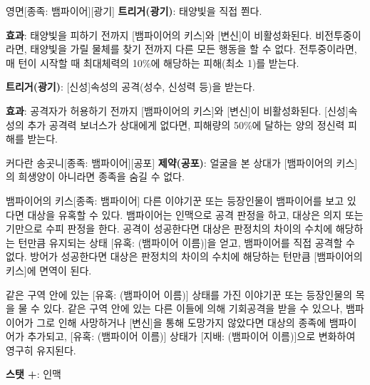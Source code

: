 \documentclass{report}
\begin{document}
	\begin{story}{영면}{[종족: 뱀파이어][광기]}
		\textbf{트리거(광기)}: 태양빛을 직접 쬔다.
		
		\textbf{효과}: 태양빛을 피하기 전까지 [뱀파이어의 키스]와 [변신]이 비활성화된다. 비전투중이라면, 태양빛을 가릴 물체를 찾기 전까지 다른 모든 행동을 할 수 없다. 전투중이라면, 매 턴이 시작할 때 최대체력의 10\%에 해당하는 피해(최소 1)를 받는다.
		
		\smallskip
		
		\textbf{트리거(광기)}: [신성]속성의 공격(성수, 신성력 등)을 받는다.
		
		\textbf{효과}: 공격자가 허용하기 전까지 [뱀파이어의 키스]와 [변신]이 비활성화된다. [신성]속성의 추가 공격력 보너스가 상대에게 없다면, 피해량의 50\%에 달하는 양의 정신력 피해를 받는다.
		
		\smallskip
		
	\end{story}
	
	\begin{story}{커다란 송곳니}{[종족: 뱀파이어][공포]}
		\textbf{제약(공포)}: 얼굴을 본 상대가 [뱀파이어의 키스]의 희생양이 아니라면 종족을 숨길 수 없다.
		
		\smallskip
		
	\end{story}
	
	\begin{story}{뱀파이어의 키스}{[종족: 뱀파이어]}
		다른 이야기꾼 또는 등장인물이 뱀파이어를 보고 있다면 대상을 유혹할 수 있다. 뱀파이어는 인맥으로 공격 판정을 하고, 대상은 의지 또는 기만으로 수피 판정을 한다. 공격이 성공한다면 대상은 판정치의 차이의 수치에 해당하는 턴만큼 유지되는 상태 [유혹: (뱀파이어 이름)]을 얻고, 뱀파이어를 직접 공격할 수 없다. 방어가 성공한다면 대상은 판정치의 차이의 수치에 해당하는 턴만큼 [뱀파이어의 키스]에 면역이 된다.
		
		\smallskip
		
		같은 구역 안에 있는 [유혹: (뱀파이어 이름)] 상태를 가진 이야기꾼 또는 등장인물의 목을 물 수 있다. 같은 구역 안에 있는 다른 이들에 의해 기회공격을 받을 수 있으나, 뱀파이어가 그로 인해 사망하거나 [변신]을 통해 도망가지 않았다면 대상의 종족에 뱀파이어가 추가되고, [유혹: (뱀파이어 이름)] 상태가 [지배: (뱀파이어 이름)]으로 변화하여 영구히 유지된다.
		
		\smallskip
		
		\textbf{스탯 +}: 인맥
		
		\smallskip
		
	\end{story}
	
\end{document}
